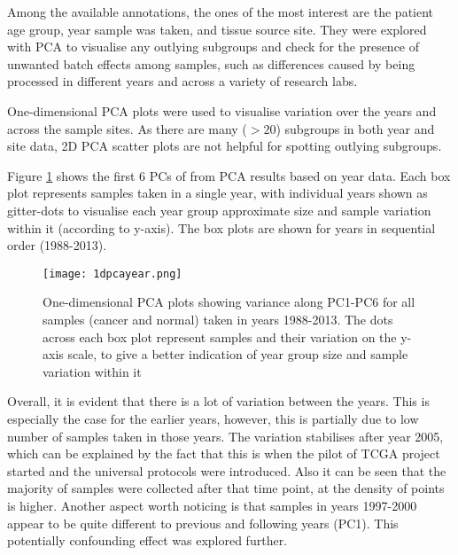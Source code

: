     Among the available annotations, the ones of the most interest are the patient age group, year sample was taken, and tissue source site. They were explored with PCA to visualise any outlying subgroups and check for the presence of unwanted batch effects among samples, such as differences caused by being processed in different years and across a variety of research labs.
    
    One-dimensional PCA plots were used to visualise variation over the years and across the sample sites. As there are many ($>20$) subgroups in both year and site data, 2D PCA scatter plots are not helpful for spotting outlying subgroups. 
    
    Figure \ref{fig:1dpcayear} shows the first 6 PCs of from PCA results based on year data. Each box plot represents samples taken in a single year, with individual years shown as gitter-dots to visualise each year group approximate size and sample variation within it (according to y-axis). The box plots are shown for years in sequential order (1988-2013). \\
  
        
            \begin{figure}[!h]
            \centering
            \texttt{[image: 1dpcayear.png]}
            \caption{One-dimensional PCA plots showing variance along PC1-PC6 for all samples (cancer and normal) taken in years 1988-2013. The dots across each box plot represent samples and their variation on the y-axis scale, to give a better indication of year group size and sample variation within it}
            \label{fig:1dpcayear}
            \end{figure}
    
    Overall, it is evident that there is a lot of variation between the years. This is especially the case for the earlier years, however, this is partially due to low number of samples taken in those years.  The variation stabilises after year 2005, which can be explained by the fact that this is when the pilot of TCGA project started and the universal protocols were introduced. Also it can be seen that the majority of samples were collected after that time point, at the density of points is higher. Another aspect worth noticing is that samples in years 1997-2000 appear to be quite different to previous and following years (PC1). This potentially confounding effect was explored further. \\
    \newline
    
